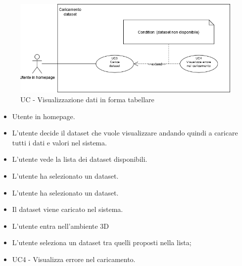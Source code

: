 \begin{figure}[h!]
    \centering
    \includegraphics[scale=0.7]{template/images/UC3.png}
    \caption{UC - Visualizzazione dati in forma tabellare}
\end{figure}
    \UCdsc
    { %
        \begin{itemize}
            \item Utente in homepage.
        \end{itemize}
    }
    { %
        \begin{itemize}
            \item  L'utente decide il dataset che vuole visualizzare andando quindi a caricare tutti i dati e valori nel sistema.
        \end{itemize}
    }
    { %
        \begin{itemize}
            \item L'utente vede la lista dei dataset disponibili.
            \item L'utente ha selezionato un dataset.
        \end{itemize}
    }
    { %
        \begin{itemize}
            \item L'utente ha selezionato un dataset.
            \item Il dataset viene caricato nel sistema.
            \item L'utente entra nell'ambiente 3D
        \end{itemize}
    }
    { %
        \begin{itemize}
            \item L'utente seleziona un dataset tra quelli proposti nella lista;
        \end{itemize}
    }
    { %
        \begin{itemize}
            \item UC4 - Visualizza errore nel caricamento.
        \end{itemize}
    }

